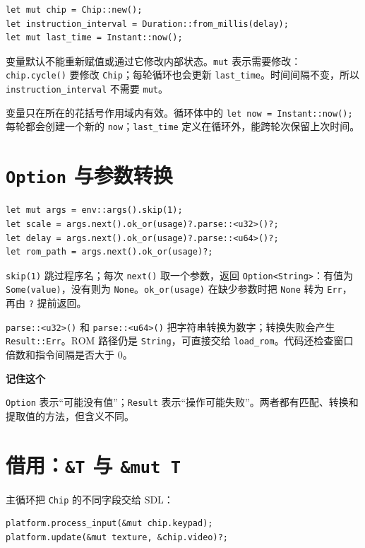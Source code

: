 \documentclass[UTF8,11pt,a4paper]{ctexart}
\newenvironment{keypoint}{
  \par\medskip\noindent\begingroup\setlength{\fboxsep}{11pt}
  \begin{lrbox}{\keybox}\begin{minipage}{\dimexpr\textwidth-2\fboxsep-3pt\relax}
  {\footnotesize\sffamily\bfseries\color{accent}记住这个}\par\smallskip\color{ink}
}{
  \end{minipage}\end{lrbox}\colorbox{pale}{\usebox{\keybox}}\endgroup\par\medskip
}
\begin{document}
\begin{lstlisting}
let mut chip = Chip::new();
let instruction_interval = Duration::from_millis(delay);
let mut last_time = Instant::now();
\end{lstlisting}

变量默认不能重新赋值或通过它修改内部状态。\texttt{mut} 表示需要修改：\texttt{chip.cycle()} 要修改 \texttt{Chip}；每轮循环也会更新 \texttt{last\_time}。时间间隔不变，所以 \texttt{instruction\_interval} 不需要 \texttt{mut}。

变量只在所在的花括号作用域内有效。循环体中的 \texttt{let now = Instant::now();} 每轮都会创建一个新的 \texttt{now}；\texttt{last\_time} 定义在循环外，能跨轮次保留上次时间。

\section{\texttt{Option} 与参数转换}

\begin{lstlisting}
let mut args = env::args().skip(1);
let scale = args.next().ok_or(usage)?.parse::<u32>()?;
let delay = args.next().ok_or(usage)?.parse::<u64>()?;
let rom_path = args.next().ok_or(usage)?;
\end{lstlisting}

\texttt{skip(1)} 跳过程序名；每次 \texttt{next()} 取一个参数，返回 \texttt{Option<String>}：有值为 \texttt{Some(value)}，没有则为 \texttt{None}。\texttt{ok\_or(usage)} 在缺少参数时把 \texttt{None} 转为 \texttt{Err}，再由 \texttt{?} 提前返回。

\texttt{parse::<u32>()} 和 \texttt{parse::<u64>()} 把字符串转换为数字；转换失败会产生 \texttt{Result::Err}。ROM 路径仍是 \texttt{String}，可直接交给 \texttt{load\_rom}。代码还检查窗口倍数和指令间隔是否大于 0。

\begin{keypoint}
\texttt{Option} 表示“可能没有值”；\texttt{Result} 表示“操作可能失败”。两者都有匹配、转换和提取值的方法，但含义不同。
\end{keypoint}

\section{借用：\texttt{\&T} 与 \texttt{\&mut T}}

主循环把 \texttt{Chip} 的不同字段交给 SDL：

\begin{lstlisting}
platform.process_input(&mut chip.keypad);
platform.update(&mut texture, &chip.video)?;
\end{lstlisting}
\end{document}
